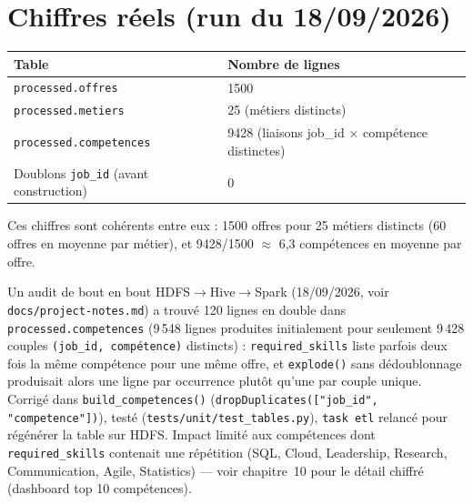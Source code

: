 \section{Chiffres réels (run du 18/09/2026)}

\begin{center}
\begin{tabular}{ll}
\toprule
Table & Nombre de lignes \\
\midrule
\texttt{processed.offres} & 1500 \\
\texttt{processed.metiers} & 25 (métiers distincts) \\
\texttt{processed.competences} & 9428 (liaisons job\_id $\times$ compétence distinctes) \\
\midrule
Doublons \texttt{job\_id} (avant construction) & 0 \\
\bottomrule
\end{tabular}
\end{center}

Ces chiffres sont cohérents entre eux : 1500 offres pour 25 métiers
distincts (60 offres en moyenne par métier), et 9428/1500 $\approx$
6,3 compétences en moyenne par offre.

\begin{constat}
Un audit de bout en bout HDFS$\to$Hive$\to$Spark (18/09/2026, voir
\texttt{docs/project-notes.md}) a trouvé 120 lignes en double dans
\texttt{processed.competences} (9\,548 lignes produites initialement
pour seulement 9\,428 couples \texttt{(job\_id, compétence)} distincts)
: \texttt{required\_skills} liste parfois deux fois la même compétence
pour une même offre, et \texttt{explode()} sans dédoublonnage produisait
alors une ligne par occurrence plutôt qu'une par couple unique. Corrigé
dans \texttt{build\_competences()}
(\texttt{dropDuplicates(["job\_id", "competence"])}), testé
(\texttt{tests/unit/test\_tables.py}), \texttt{task etl} relancé pour
régénérer la table sur HDFS. Impact limité aux compétences dont
\texttt{required\_skills} contenait une répétition (SQL, Cloud,
Leadership, Research, Communication, Agile, Statistics) — voir
chapitre~10 pour le détail chiffré (dashboard top 10 compétences).
\end{constat}
